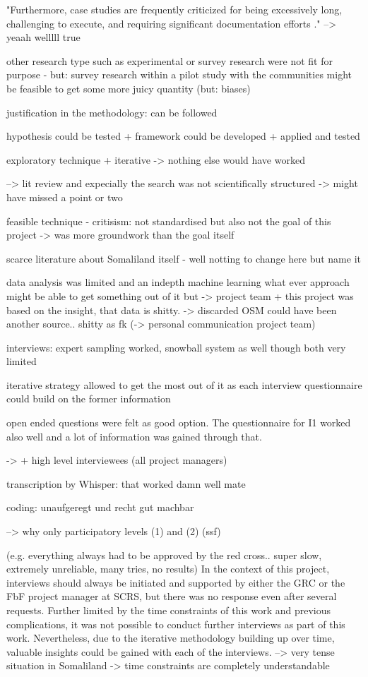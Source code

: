 "Furthermore, case studies are frequently criticized for being excessively long, challenging to execute, and requiring significant documentation efforts \autocite{yinCaseStudyResearch1984}."
--> yeaah welllll true

other research type such as experimental or survey research were not fit for purpose - but: survey research within a pilot study with the communities might be feasible to get some more juicy quantity (but: biases)

justification in the methodology: can be followed

hypothesis could be tested + framework could be developed + applied and tested


exploratory technique + iterative -> nothing else would have worked

--> lit review and expecially the search was not scientifically structured -> might have missed a point or two

feasible technique - critisism: not standardised but also not the goal of this project -> was more groundwork than the goal itself

scarce literature about Somaliland itself - well notting to change here but name it

data analysis was limited and an indepth machine learning what ever approach might be able to get something out of it but -> project team + this project was based on the insight, that data is shitty. -> discarded
OSM could have been another source.. shitty as fk (-> personal communication project team)

interviews:
expert sampling worked, snowball system as well though both very limited

iterative strategy allowed to get the most out of it as each interview questionnaire could build on the former information

open ended questions were felt as good option. The questionnaire for I1 worked also well and a lot of information was gained through that.

-> + high level interviewees (all project managers)

transcription by Whisper: that worked damn well mate

coding: unaufgeregt und recht gut machbar


--> why only participatory levels (1) and (2) (ssf)


(e.g. everything always had to be approved by the red cross.. super slow, extremely unreliable, many tries, no results)
In the context of this project, interviews should always be initiated and supported by either the GRC or the FbF project manager at SCRS, but there was no response even after several requests. Further limited by the time constraints of this work and previous complications, it was not possible to conduct further interviews as part of this work. Nevertheless, due to the iterative methodology building up over time, valuable insights could be gained with each of the interviews. 
--> very tense situation in Somaliland -> time constraints are completely understandable


